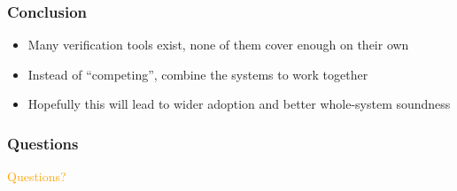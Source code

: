 \documentclass[compress]{beamer}
\begin{document}
\begin{frame}
  \frametitle{Conclusion}

  \begin{itemize}
    \item Many verification tools exist, none of them cover enough on their own
    \item Instead of ``competing'', combine the systems to work together
    \item Hopefully this will lead to wider adoption and better whole-system
          soundness
  \end{itemize}

\end{frame}

\begin{frame}
  \frametitle{Questions}

  \begin{center}
    \textcolor{orange}{\Large Questions?}
  \end{center}

\end{frame}
\end{document}
